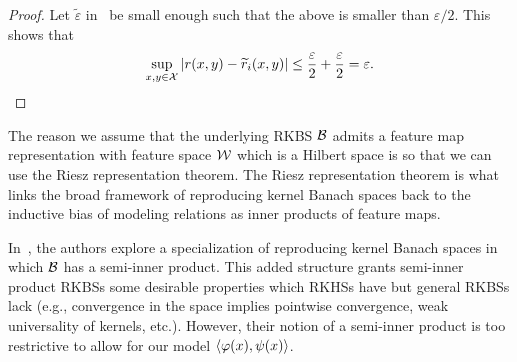 \begin{proof}
    Let $\tilde{\varepsilon}$ in~ be small enough such that the above is smaller than $\varepsilon / 2$. This shows that
    \begin{equation*}
        \sup_{x,y \in \calX} \abs{r(x,y) - \tilde{r}_i(x,y)} \leq \frac{\varepsilon}{2} + \frac{\varepsilon}{2} = \varepsilon.
    \end{equation*}
\end{proof}

\begin{remark}
    The reason we assume that the underlying RKBS ${\mathcal{B}}$ admits a feature map representation with feature space ${\mathcal{W}}$ which is a Hilbert space is so that we can use the Riesz representation theorem. The Riesz representation theorem is what links the broad framework of reproducing kernel Banach spaces back to the inductive bias of modeling relations as inner products of feature maps.
\end{remark}

\begin{remark}
    In~\parencite{zhangReproducingKernel2009}, the authors explore a specialization of reproducing kernel Banach spaces in which ${\mathcal{B}}$ has a semi-inner product. This added structure grants semi-inner product RKBSs some desirable properties which RKHSs have but general RKBSs lack (e.g., convergence in the space implies pointwise convergence, weak universality of kernels, etc.). However, their notion of a semi-inner product is too restrictive to allow for our model $\left \langle \varphi(x), \psi(x) \right\rangle$.
\end{remark}